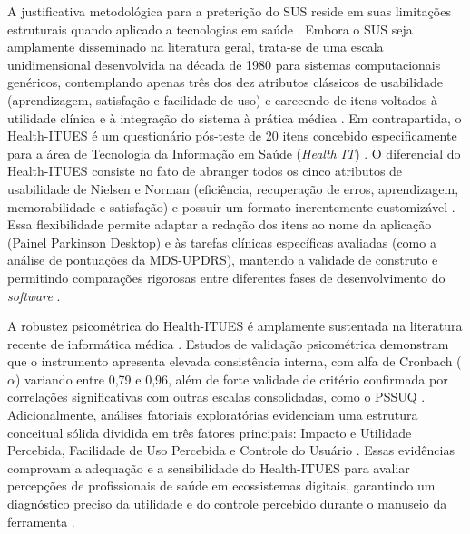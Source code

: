 A justificativa metodológica para a preterição do SUS reside em suas limitações estruturais quando aplicado a tecnologias em saúde \cite{RussJara2025}. Embora o SUS seja amplamente disseminado na literatura geral, trata-se de uma escala unidimensional desenvolvida na década de 1980 para sistemas computacionais genéricos, contemplando apenas três dos dez atributos clássicos de usabilidade (aprendizagem, satisfação e facilidade de uso) e carecendo de itens voltados à utilidade clínica e à integração do sistema à prática médica \cite{RussJara2025}. Em contrapartida, o Health-ITUES é um questionário pós-teste de 20 itens concebido especificamente para a área de Tecnologia da Informação em Saúde (\textit{Health IT}) \cite{RussJara2025}. O diferencial do Health-ITUES consiste no fato de abranger todos os cinco atributos de usabilidade de Nielsen e Norman (eficiência, recuperação de erros, aprendizagem, memorabilidade e satisfação) e possuir um formato inerentemente customizável \cite{RussJara2025}. Essa flexibilidade permite adaptar a redação dos itens ao nome da aplicação (Painel Parkinson Desktop) e às tarefas clínicas específicas avaliadas (como a análise de pontuações da MDS-UPDRS), mantendo a validade de construto e permitindo comparações rigorosas entre diferentes fases de desenvolvimento do \textit{software} \cite{RussJara2025}.

A robustez psicométrica do Health-ITUES é amplamente sustentada na literatura recente de informática médica \cite{Gerchow2026}. Estudos de validação psicométrica demonstram que o instrumento apresenta elevada consistência interna, com alfa de Cronbach ($\alpha$) variando entre 0,79 e 0,96, além de forte validade de critério confirmada por correlações significativas com outras escalas consolidadas, como o PSSUQ \cite{Gerchow2026}. Adicionalmente, análises fatoriais exploratórias evidenciam uma estrutura conceitual sólida dividida em três fatores principais: Impacto e Utilidade Percebida, Facilidade de Uso Percebida e Controle do Usuário \cite{Gerchow2026}. Essas evidências comprovam a adequação e a sensibilidade do Health-ITUES para avaliar percepções de profissionais de saúde em ecossistemas digitais, garantindo um diagnóstico preciso da utilidade e do controle percebido durante o manuseio da ferramenta \cite{Gerchow2026}.

